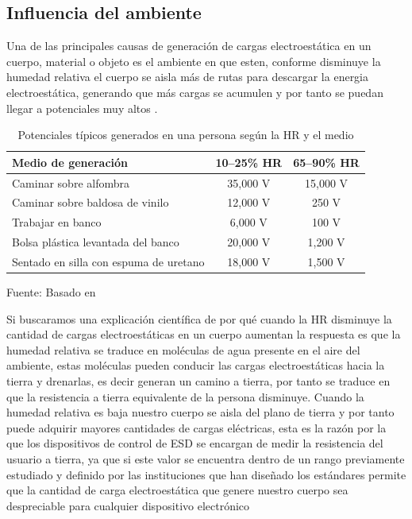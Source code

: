         \subsection{Influencia del ambiente}

            Una de las principales causas de generación de cargas electroestática en un cuerpo, material o objeto es 
            el ambiente en que esten, conforme disminuye la humedad relativa el cuerpo se aisla más de rutas para 
            descargar la energia electroestática, generando que más cargas se acumulen y por tanto se puedan llegar 
            a potenciales muy altos \cite{versalogic_esd}.

            \begin{table}[H]
                \centering
                \caption{Potenciales típicos generados en una persona según la HR y el medio}
                \begin{tabularx}{\linewidth}{Xcc}
                \toprule
                \textbf{Medio de generación} & \textbf{10--25\% HR} & \textbf{65--90\% HR} \\
                \midrule
                Caminar sobre alfombra & 35,000 V & 15,000 V \\
                Caminar sobre baldosa de vinilo & 12,000 V & 250 V \\
                Trabajar en banco & 6,000 V & 100 V \\
                Bolsa plástica levantada del banco & 20,000 V & 1,200 V \\
                Sentado en silla con espuma de uretano & 18,000 V & 1,500 V \\
                \bottomrule
                \end{tabularx}
                \label{tab:esd_humidity}

                {\small Fuente: Basado en \cite{versalogic_esd}}
            \end{table}

            Si buscaramos una explicación científica de por qué cuando la HR disminuye la cantidad de cargas electroestáticas
            en un cuerpo aumentan la respuesta es que la humedad relativa se traduce en moléculas de agua presente en el aire 
            del ambiente, estas moléculas pueden conducir las cargas electroestáticas hacia la tierra y drenarlas, es decir 
            generan un camino a tierra, por tanto se traduce en que la resistencia a tierra equivalente de la persona 
            disminuye. Cuando la humedad relativa es baja nuestro cuerpo se aisla del plano de tierra y por tanto puede 
            adquirir mayores cantidades de cargas eléctricas, esta es la razón por la que los dispositivos de control de ESD 
            se encargan de medir la resistencia del usuario a tierra, ya que si este valor se encuentra dentro de un rango 
            previamente estudiado y definido por las instituciones que han diseñado los estándares permite que la cantidad 
            de carga electroestática que genere nuestro cuerpo sea despreciable para cualquier dispositivo electrónico \cite{versalogic_esd}


